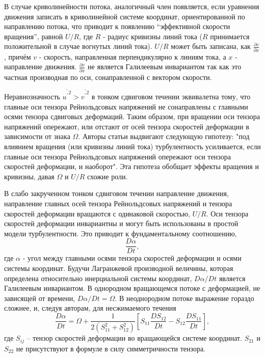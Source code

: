 		В случае криволинейности потока, аналогичный член появляется, если уравнения движения записать в криволинейной системе координат, ориентированной по направлению потока, что приводит к появлению ``эффективной скорости вращения'', равной $U/R$, где $R$ - радиус кривизны линий тока ($R$ принимается положительной в случае вогнутых линий тока). $U/R$ может быть записана, как $\frac{\partial v}{\partial x}$, причём $v$ - скорость, направленная перпендикулярно к линиям тока, а $x$ - направление движения. $\frac{\partial v}{\partial x}$ не является Галилеевым инвариантом так как это частная производная по оси, сонаправленной с вектором скорости.
		
		Неравнозначность $\overline{{u^{'}}^2} > \overline{{v^{'}}^2}$ в тонком сдвиговом течении эквивалетна тому, что главные оси тензора Рейнольдсовых напряжений не сонаправлены с главными осями тензора сдвиговых деформаций. Таким образом, при вращении оси тензора напряжений опережают, или отстают от осей тензора скоростей деформации в зависимости от знака $\Omega$. Авторы статьи выдвигают следующую гипотезу: "под влиянием вращения (или кривизны линий тока) турбулентность усиливается, если главные оси тензора Рейнольдсовых напряжений опережают оси тензора скоростей деформации, и наоборот". Эта гипотеза обобщает эффекты вращения и кривизны, давая $\Omega$ и $U/R$ схожие роли.
		
		В слабо закрученном тонком сдвиговом течении направление движения, направление главных осей тензора Рейнольдсовых напряжений и тензора скоростей деформации вращаются с одинаковой скоростью, $U/R$. Оси тензора скоростей деформации инвариантны и могут быть использованы в простой модели турбулентности. Это приводит к фундаментальному соотношению, 
		$$
			\frac{D\alpha}{Dt},
		$$
		где $\alpha$ - угол между главными осями тензора скоростей деформации и осями системы координат. Будучи Лагранжевой производной величины, которая определена относительно инерциальной системы координат, $D\alpha/Dt$ является Галилеевым инвариантом. В однородном вращающемся потоке с деформацией, не зависящей от времени, $D\alpha/Dt = \Omega$. В неоднородном потоке выражение гораздо сложнее, и, следуя авторам, для несжимаемого течения
		\begin{equation}
			\frac{D\alpha}{Dt} = \Omega + \frac{1}{2\left( S_{11}^2 + S_{12}^2 \right)} \left[ S_{11} \frac{DS_{12}}{Dt} - S_{12} \frac{DS_{11}}{Dt} \right],
		\end{equation}
		где $S_{ij}$ -- тензор скоростей деформации во вращающейся системе координат. $S_{21}$ и $S_{22}$ не присутствуют в формуле в силу симметричности тензора.
		
